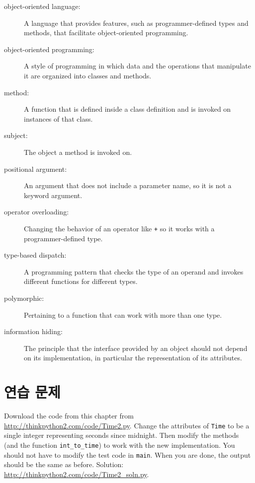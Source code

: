 \documentclass[10pt]{book}
\begin{document}
\begin{description}

\item[object-oriented language:] A language that provides features,
  such as programmer-defined types and methods, that facilitate
  object-oriented programming.

\item[object-oriented programming:] A style of programming in which
data and the operations that manipulate it are organized into classes
and methods.

\item[method:] A function that is defined inside a class definition and
is invoked on instances of that class.

\item[subject:] The object a method is invoked on.

\item[positional argument:]  An argument that does not include
a parameter name, so it is not a keyword argument.

\item[operator overloading:] Changing the behavior of an operator like
{\tt +} so it works with a programmer-defined type.

\item[type-based dispatch:] A programming pattern that checks the type
of an operand and invokes different functions for different types.

\item[polymorphic:] Pertaining to a function that can work with more
  than one type.  

\item[information hiding:] The principle that the interface provided 
by an object should not depend on its implementation, in particular
the representation of its attributes.

\end{description}


\section{연습 문제}

\begin{exercise}

Download the code from this chapter from
\url{http://thinkpython2.com/code/Time2.py}.  Change the attributes of
    {\tt Time} to be a single integer representing seconds since
    midnight.  Then modify the methods (and the function
    \verb"int_to_time") to work with the new implementation.  You
    should not have to modify the test code in {\tt main}.  When you
    are done, the output should be the same as before.  Solution:
    \url{http://thinkpython2.com/code/Time2_soln.py}.

\end{exercise}
\end{document}
